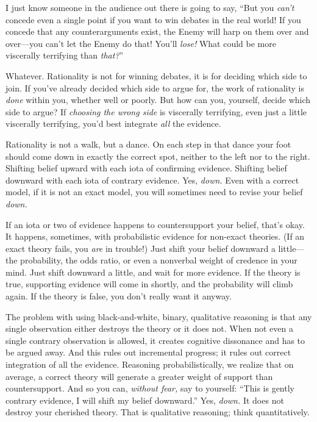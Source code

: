 {
 I just know someone in the audience out there is going to say,
``But you \textit{can't} concede even
a single point if you want to win debates in the real world! If you
concede that any counterarguments exist, the Enemy will harp on them
over and over---you can't let the Enemy do that!
You'll \textit{lose!} What could be more viscerally
terrifying than \textit{that?}''}

{
 Whatever. Rationality is not for winning debates, it is for
deciding which side to join. If you've already decided
which side to argue for, the work of rationality is \textit{done}
within you, whether well or poorly. But how can you, yourself, decide
which side to argue? If \textit{choosing the wrong side} is viscerally
terrifying, even just a little viscerally terrifying,
you'd best integrate \textit{all} the evidence.}

{
 Rationality is not a walk, but a dance. On each step in that dance
your foot should come down in exactly the correct spot, neither to the
left nor to the right. Shifting belief upward with each iota of
confirming evidence. Shifting belief downward with each iota of
contrary evidence. Yes, \textit{down.} Even with a correct model, if it
is not an exact model, you will sometimes need to revise your belief
\textit{down.}}

{
 If an iota or two of evidence happens to countersupport your
belief, that's okay. It happens, sometimes, with
probabilistic evidence for non-exact theories. (If an exact theory
fails, you \textit{are} in trouble!) Just shift your belief downward a
little---the probability, the odds ratio, or even a nonverbal weight of
credence in your mind. Just shift downward a little, and wait for more
evidence. If the theory is true, supporting evidence will come in
shortly, and the probability will climb again. If the theory is false,
you don't really want it anyway.}

{
 The problem with using black-and-white, binary, qualitative
reasoning is that any single observation either destroys the theory or
it does not. When not even a single contrary observation is allowed, it
creates cognitive dissonance and has to be argued away. And this rules
out incremental progress; it rules out correct integration of all the
evidence. Reasoning probabilistically, we realize that on average, a
correct theory will generate a greater weight of support than
countersupport. And so you can, \textit{without fear,} say to yourself:
``This is gently contrary evidence, I will shift my
belief downward.'' Yes, \textit{down.} It does not
destroy your cherished theory. That is qualitative reasoning; think
quantitatively.}

